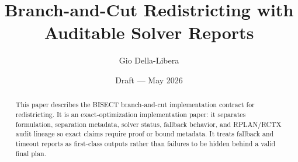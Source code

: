 \documentclass[12pt]{article}
\title{Branch-and-Cut Redistricting with Auditable Solver Reports}
\author{Gio Della-Libera}
\date{Draft --- May 2026}
\begin{document}
\maketitle

\begin{abstract}
This paper describes the BISECT branch-and-cut implementation contract for
redistricting. It is an exact-optimization implementation paper: it
separates formulation, separation metadata, solver status, fallback behavior,
and RPLAN/RCTX audit lineage so exact claims require proof or bound metadata.
It treats fallback and timeout reports as first-class outputs rather than
failures to be hidden behind a valid final plan.
\end{abstract}








\nocite{bisect-u16-plan}


\end{document}
